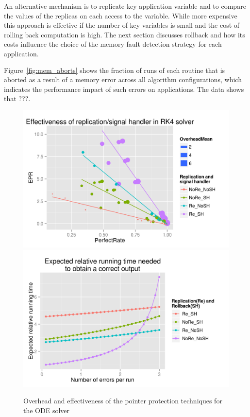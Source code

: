 \documentclass{sig-alternate}
\begin{document}
An alternative mechanism is to replicate key application variable and to compare the values of the replicas on each access to the variable.
While more expensive this approach is effective if the number of key variables is small and the cost of rolling back computation is high.
The next section discusses rollback and how its costs influence the choice of the memory fault detection strategy for each application.

Figure~\ref{fig:mem_aborts} shows the fraction of runs of each routine that is aborted as a result of a memory error across all algorithm configurations, which indicates the performance impact of such errors on applications.
The data shows that  ???.

\begin{figure}[ht!]
\centering
\includegraphics[width=1.00\columnwidth]{figs/4_1_2_Exp2_Effectiveness.png}
\includegraphics[width=1.00\columnwidth]{figs/4_1_2_Exp2_Expected_Running_Time_Needed.png}
\caption{Overhead and effectiveness of the pointer protection techniques for the ODE solver}
\label{fig:rk4_eff_ovhd}
\end{figure}
\end{document}
